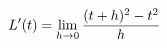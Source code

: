 \documentclass[preview]{standalone}
\begin{document}
\begin{align*}
\special{dvisvgm:raw <g id='unique000'>}L'(t)=\lim_{h\to0}\frac{(t+h)^2-t^2}{h}\special{dvisvgm:raw </g>}
\end{align*}
\end{document}
